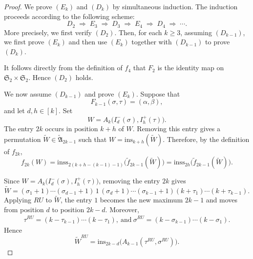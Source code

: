 \documentclass[12pt]{amsart}
\theoremstyle{definition}
\numberwithin{equation}{section}
\newcommand{\ins}[1]{\mathrm{ins}_{#1}}
\newcommand{\inss}[1]{\mathrm{inss}_{#1}}
\begin{document}
\begin{proof}
We prove $(E_k)$ and $(D_k)$ by simultaneous induction. The induction proceeds according to the following scheme:
\begin{equation*}
D_2
\;\Longrightarrow\;
E_3
\;\Longrightarrow\;
D_3
\;\Longrightarrow\;
E_4
\;\Longrightarrow\;
D_4
\;\Longrightarrow\;
\cdots .
\end{equation*}
More precisely,
we first verify $(D_2)$. Then, for each $k\geq 3$, assuming
$(D_{k-1})$, we first prove $(E_k)$ and then use $(E_k)$ together with
$(D_{k-1})$ to prove $(D_k)$.

It follows directly from the definition of $f_4$ that $F_2$ is the
identity map on $\mathfrak{S}_2\times\mathfrak{S}_2$. Hence $(D_2)$
holds.

We now assume $(D_{k-1})$ and prove $(E_k)$. Suppose that
\begin{equation*}
F_{k-1}(\sigma,\tau)=(\alpha,\beta),
\end{equation*}
and let $d,h\in[k]$. Set
\begin{equation*}
W=A_k\bigl(I_d^-(\sigma),I_h^+(\tau)\bigr).
\end{equation*}
The entry $2k$ occurs in position $k+h$ of $W$. Removing this entry
gives a permutation $\widetilde W\in\widetilde{\mathfrak A}_{2k-1}$
such that
$W=\ins{k+h}(\widetilde W).$
Therefore, by the definition of $f_{2k}$,
\begin{equation*}
f_{2k}(W)
=
\inss{2(k+h-(k-1)-1)}\bigl(\tilde f_{2k-1}(\widetilde W)\bigr) = \inss{2h}\bigl(\tilde f_{2k-1}(\widetilde W)\bigr).
\end{equation*}

Since $W=A_k\bigl(I_d^-(\sigma),I_h^+(\tau)\bigr)$, removing the entry $2k$ gives
\begin{equation*}
\widetilde W
=
(\sigma_1+1)\cdots(\sigma_{d-1}+1)\,1\,
(\sigma_d+1)\cdots(\sigma_{k-1}+1)
(k+\tau_1)\cdots(k+\tau_{k-1}).
\end{equation*}
Applying $RU$ to $\widetilde W$, the entry $1$ becomes the new maximum
$2k-1$ and moves from position $d$ to position $2k-d$. Moreover,
\begin{gather*}
\tau^{RU}
=
(k-\tau_{k-1})\cdots(k-\tau_1), \ \text{and} \ \sigma^{RU}
=
(k-\sigma_{k-1})\cdots(k-\sigma_1).
\end{gather*}
Hence
\begin{equation*}
\widetilde W^{RU}
=
\ins{2k-d}
\bigl(A_{k-1}(\tau^{RU},\sigma^{RU})\bigr).
\end{equation*}


\end{proof}
\end{document}
